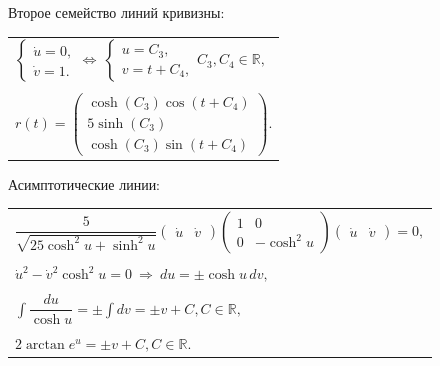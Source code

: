 \documentclass[12pt,a4paper]{article}
\begin{document}
    Второе семейство линий кривизны:

    \begin{table}[h]
        \centering
        \begin{tabular}{l}
            $
                \begin{cases}
                    \dot u = 0,
                    \\
                    \dot v = 1.
                \end{cases}
                \Leftrightarrow\ 
                \begin{cases}
                    u = C_3,
                    \\
                    v = t + C_4,
                \end{cases}
                C_3, C_4 \in \mathbb{R},
            $
            \\ \\
            $
                r(t) =
                    \begin{pmatrix}
                        \cosh(C_3) \cos(t + C_4)
                        \\
                        5\sinh(C_3)
                        \\
                        \cosh(C_3) \sin(t + C_4)
                    \end{pmatrix}\! .
            $
        \end{tabular}
    \end{table}

    Асимптотические линии:
    \begin{table}[h]
        \centering
        \begin{tabular}{l}
            $
                \dfrac{5}{\sqrt{25\cosh^2 u + \sinh^2 u}}
                \begin{pmatrix}
                    \dot u & \dot v
                \end{pmatrix}
                \begin{pmatrix}
                    1 & 0
                    \\
                    0 & -\cosh^2 u
                \end{pmatrix}
                \begin{pmatrix}
                    \dot u & \dot v
                \end{pmatrix} = 0,
            $
            \\ \\
            $
                \dot u^2 - \dot v^2 \cosh^2 u = 0
                \ \Rightarrow \ 
                du = \pm  \cosh u \, dv,
            $
            \\ \\
            $
            \displaystyle\int{}{\dfrac{du}{\cosh u}} = \pm \int{}{dv} = \pm v + C, C \in \mathbb{R},
            $
            \\ \\
            $
                2\arctan e^u = \pm v + C, C \in \mathbb{R}.
            $
        \end{tabular}
    \end{table}
\end{document}
